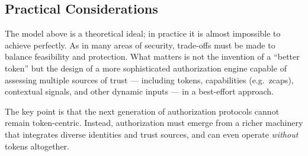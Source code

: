 \subsection{Practical Considerations}
The model above is a theoretical ideal; in practice it is almost impossible to achieve perfectly. 
As in many areas of security, trade-offs must be made to balance feasibility and protection.  
What matters is not the invention of a ``better token'' but the design of a more sophisticated 
authorization engine capable of assessing multiple sources of trust --- including tokens, 
capabilities (e.g.\ zcaps), contextual signals, and other dynamic inputs --- in a best-effort approach.  

The key point is that the next generation of authorization protocols cannot remain token-centric. 
Instead, authorization must emerge from a richer machinery that integrates diverse identities 
and trust sources, and can even operate \emph{without} tokens altogether.